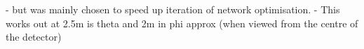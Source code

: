 - but was mainly chosen to speed up iteration of network optimisation.
- This works out at 2.5m is theta and 2m in phi approx (when viewed from the centre of the detector)